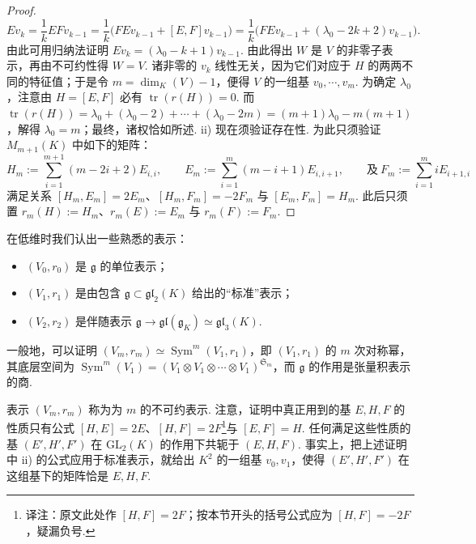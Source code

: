 \begin{numpara}[特征为零时 $\mathfrak{g} = \mathfrak{sl}_2$ 的不可约表示]
\begin{proof}
\[Ev_k = \frac{1}{k} EFv_{k-1} = \frac{1}{k} \bigl( FEv_{k-1} + [E, F] v_{k-1} \bigr) = \frac{1}{k} \bigl( FEv_{k-1} + (\lambda_0 - 2k + 2) v_{k-1} \bigr).\]
由此可用归纳法证明 $Ev_k = (\lambda_0 - k + 1) v_{k-1}$.
由此得出 $W$ 是 $V$ 的非零子表示，再由不可约性得 $W = V$. 诸非零的 $v_k$ 线性无关，因为它们对应于 $H$ 的两两不同的特征值；于是令 $m = \dim_K(V) - 1$，便得 $V$ 的一组基 $v_0, \cdots, v_m$.
为确定 $\lambda_0$，注意由 $H = [E, F]$ 必有 $\operatorname{tr}(r(H)) = 0$. 而 $\operatorname{tr}(r(H)) = \lambda_0 + (\lambda_0 - 2) + \cdots + (\lambda_0 - 2m) = (m + 1)\lambda_0 - m(m + 1)$，解得 $\lambda_0 = m$；最终，诸权恰如所述.
ii) 现在须验证存在性. 为此只须验证 $M_{m+1}(K)$ 中如下的矩阵：
\[H_m := \sum_{i=1}^{m+1} (m - 2i + 2) E_{i,i},\qquad E_m := \sum_{i=1}^{m} (m - i + 1) E_{i,i+1},\qquad \text{及}\ F_m := \sum_{i=1}^{m} i E_{i+1,i}\]
满足关系 $[H_m, E_m] = 2E_m$、$[H_m, F_m] = -2F_m$ 与 $[E_m, F_m] = H_m$. 此后只须置 $r_m(H) := H_m$、$r_m(E) := E_m$ 与 $r_m(F) := F_m$.
\end{proof}
\begin{remark*}
在低维时我们认出一些熟悉的表示：
\begin{itemize}[label=\textendash]
\item $(V_0, r_0)$ 是 $\mathfrak{g}$ 的单位表示；
\item $(V_1, r_1)$ 是由包含 $\mathfrak{g} \subset \mathfrak{gl}_2(K)$ 给出的``标准''表示；
\item $(V_2, r_2)$ 是伴随表示 $\mathfrak{g} \longrightarrow \mathfrak{gl}(\mathfrak{g}_K) \simeq \mathfrak{gl}_3(K)$.
\end{itemize}
一般地，可以证明 $(V_m, r_m) \simeq \operatorname{Sym}^m(V_1, r_1)$，即 $(V_1, r_1)$ 的 $m$ 次对称幂，其底层空间为 $\operatorname{Sym}^m(V_1) = (V_1 \otimes V_1 \otimes \cdots \otimes V_1)^{\mathfrak{S}_m}$，而 $\mathfrak{g}$ 的作用是张量积表示的商.
\end{remark*}
\begin{remark*}
表示 $(V_m, r_m)$ 称为为 $m$ 的不可约表示. 注意，证明中真正用到的基 $E, H, F$ 的性质只有公式 $[H, E] = 2E$、$[H, F] = 2F$\footnote{译注：原文此处作 $[H, F] = 2F$；按本节开头的括号公式应为 $[H, F] = -2F$，疑漏负号.}与 $[E, F] = H$. 任何满足这些性质的基 $(E', H', F')$ 在 $\mathrm{GL}_2(K)$ 的作用下共轭于 $(E, H, F)$. 事实上，把上述证明中 ii) 的公式应用于标准表示，就给出 $K^2$ 的一组基 $v_0, v_1$，使得 $(E', H', F')$ 在这组基下的矩阵恰是 $E, H, F$.
\end{remark*}
\begin{exercise*}

\end{exercise*}
\end{numpara}
